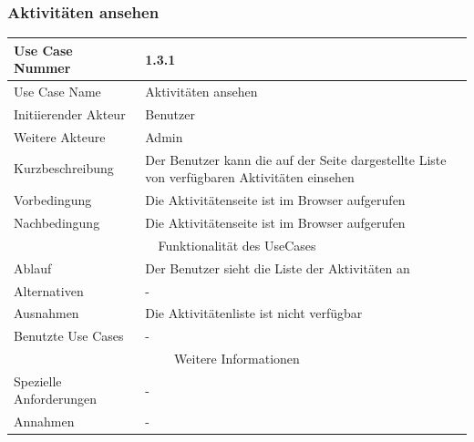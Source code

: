 \documentclass[10pt,a4paper]{article}
\begin{document}
	\subsubsection{Aktivit\"aten ansehen}
	\begin{tabular}{|l|p{.5\linewidth}|}
	\hline Use Case Nummer & 1.3.1 \\ 
	\hline Use Case Name & Aktivit\"aten ansehen \\ 
	\hline Initiierender Akteur & Benutzer \\
	\hline Weitere Akteure & Admin \\
	\hline Kurzbeschreibung & Der Benutzer kann die auf der Seite dargestellte Liste von verf\"ugbaren Aktivit\"aten einsehen \\
	\hline Vorbedingung & Die Aktivit\"atenseite ist im Browser aufgerufen \\
	\hline Nachbedingung & Die Aktivit\"atenseite ist im Browser aufgerufen \\
	\hline \multicolumn{2}{|c|}{Funktionalität des UseCases}\\
	\hline Ablauf & Der Benutzer sieht die Liste der Aktivit\"aten an \\
	\hline Alternativen & - \\
	\hline Ausnahmen & Die Aktivit\"atenliste ist nicht verf\"ugbar \\
	\hline Benutzte Use Cases & - \\
	\hline \multicolumn{2}{|c|}{Weitere Informationen} \\
	\hline Spezielle Anforderungen & - \\
	\hline Annahmen & - \\
	\hline
	\end{tabular} 
\end{document}
